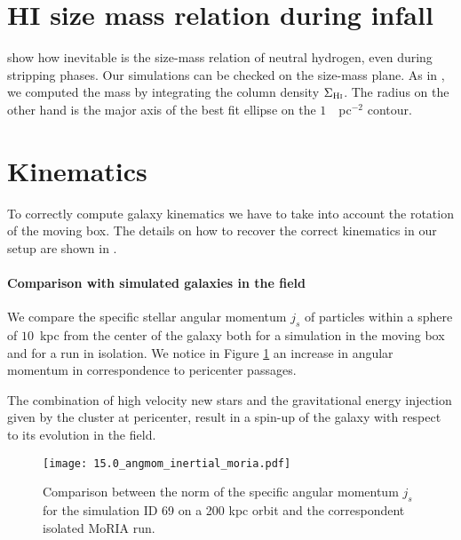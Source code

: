\section{HI size mass relation during infall}
\citet{Stevens2019} show how inevitable is the size-mass relation of neutral hydrogen, even during stripping phases.
Our simulations can be checked on the size-mass plane.
As in \citet{Verbeke2017}, we computed the \Hi{} mass by integrating the \Hi{} column density $\Sigma_{\text{H\textsc{i}}}$. The radius on the other hand is the major axis of the best fit ellipse on the $1$~\Msun{}~pc$^{-2}$ contour.


\section{Kinematics}
To correctly compute galaxy kinematics we have to take into account the rotation of the moving box.
The details on how to recover the correct kinematics in our setup are shown in .

\paragraph{Comparison with simulated galaxies in the field}
We compare the specific stellar angular momentum $j_s$ of particles within a sphere of $10$~kpc from the center of the galaxy both for a simulation in the moving box and for a run in isolation.
We notice in Figure \ref{fig:j_s_moria} an increase in angular momentum in correspondence to pericenter passages.

The combination of high velocity new stars and the gravitational energy injection given by the cluster at pericenter, result in a spin-up of the galaxy with respect to its evolution in the field.

\begin{figure}
\centering
\texttt{[image: 15.0\_angmom\_inertial\_moria.pdf]}
\caption{Comparison between the norm of the specific angular momentum $j_s$for the simulation ID 69 on a 200 kpc orbit and the correspondent isolated MoRIA run.}
\label{fig:j_s_moria}
\end{figure}

